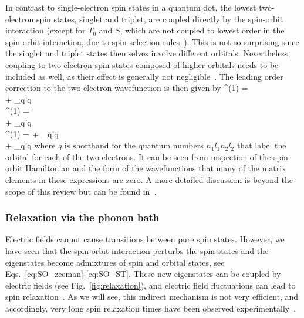 \documentclass[rmp,twocolumn,aps]{revtex4}
\begin{document}
In contrast to single-electron spin states in a quantum dot, the
lowest two-electron spin states, singlet and triplet, are coupled
directly by the spin-orbit interaction (except for $T_0$ and $S$,
which are not coupled to lowest order in the spin-orbit
interaction, due to spin selection
rules~\cite{dickmann03,sasaki05,golovach07,florescu06,climente06}). This is not so surprising since the singlet and triplet states
themselves involve different orbitals. Nevertheless, coupling to
two-electron spin states composed of higher orbitals needs to be
included as well, as their effect is generally not 
negligible~\cite{golovach07,climente06}. The leading order correction
to the two-electron wavefunction is then given by 
\bea
{}^{(1)} =  \hspace*{3.5cm} \nonumber \\
+ \sum_{q'\neq q}  \\
^{(1)} =  \hspace*{3.5cm} \nonumber \\
+ \sum_{q'\neq q}  \\
^{(1)} = 
+ \sum_{q'\neq q}   \nonumber \\
+ \sum_{q'\neq q}  
\label{eq:SO_ST} 
\eea 
where $q$ is shorthand for the quantum
numbers $n_1 l_1 n_2 l_2$ that label the orbital for each of the
two electrons. It can be seen from inspection of the spin-orbit
Hamiltonian and the form of the wavefunctions that many of the
matrix elements in these expressions are zero. A more detailed
discussion is beyond the scope of this review but can be found
in~\textcite{golovach07,climente06}.


\subsubsection{Relaxation via the phonon bath}
\label{Sec:RelaxationviaPhononBath}
Electric fields cannot cause transitions between pure spin states.
However, we have seen that the spin-orbit interaction perturbs the
spin states and the eigenstates become admixtures of spin and
orbital states, see Eqs.~\ref{eq:SO_zeeman}-\ref{eq:SO_ST}. These
new eigenstates can be coupled by electric fields (see
Fig.~\ref{fig:relaxation}), and electric field fluctuations can
lead to spin relaxation~\cite{khaetskii00,khaetskii01,woods02}. As
we will see, this indirect mechanism is not very efficient, and
accordingly, very long spin relaxation times have been observed
experimentally~\cite{FujisawaPRB2001,FujisawaNature2002,HansonPRL2003,ElzermanNature2004,kroutvar04,HansonPRL2005,sasaki05,meunier07,amasha06}.
\end{document}

